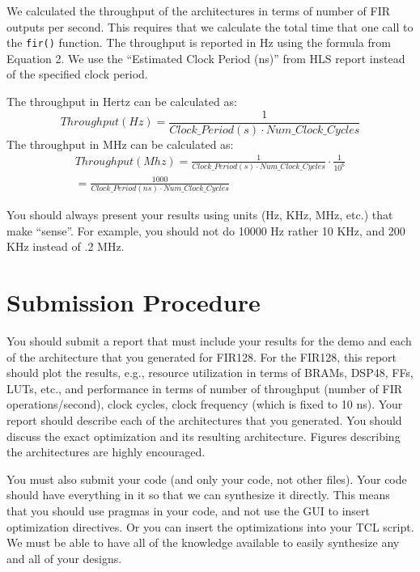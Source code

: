 We calculated the throughput of the architectures in terms of number of FIR outputs per second. This requires that we calculate the total time that one call to the \texttt{fir()} function. The throughput is reported in Hz using the formula from Equation 2. We use the ``Estimated Clock Period (ns)'' from HLS report instead of the specified clock period. 

The throughput in Hertz can be calculated as:
\begin{equation}
Throughput (Hz) = \frac{1}{Clock\_Period (s) \cdot Num\_Clock \_Cycles}
\end{equation}                           	
The throughput in MHz can be calculated as:
\begin{align*}
Throughput (Mhz) = \frac{1}{Clock\_Period (s) \cdot Num\_Clock\_Cycles} \cdot \frac{1}{10^6} \\
  		                        = \frac{1000}{Clock\_Period (ns) \cdot Num\_Clock\_Cycles}                    
\end{align*}

You should always present your results using units (Hz, KHz, MHz, etc.) that make ``sense''. For example, you should not do 10000 Hz rather 10 KHz, and 200 KHz instead of .2 MHz.


\section{Submission Procedure}

You should submit a report that must include your results for the demo and each of the architecture that you generated for FIR128. For the FIR128, this report should plot the results,  e.g., resource utilization in terms of BRAMs, DSP48, FFs, LUTs, etc., and performance in terms of number of throughput (number of FIR operations/second), clock cycles, clock frequency (which is fixed to 10 ns). Your report should describe each of the architectures that you generated. You should discuss the exact optimization and its resulting architecture. Figures describing the architectures are highly encouraged.

You must also submit your code (and only your code, not other files). Your code should have everything in it so that we can synthesize it directly. This means that you should use pragmas in your code, and not use the GUI to insert optimization directives. Or you can insert the optimizations into your TCL script. We must be able to have all of the knowledge available to easily synthesize any and all of your designs.

